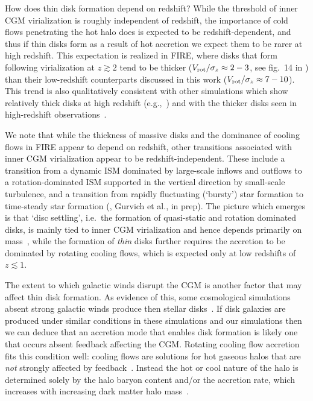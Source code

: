 \documentclass[fleqn,usenatbib]{mnras}
\begin{document}
How does thin disk formation depend on redshift?
While the threshold of inner CGM virialization is roughly independent of redshift, the importance of cold flows penetrating the hot halo does is expected to be redshift-dependent, and thus if thin disks form as a result of hot accretion we expect them to be rarer at high redshift.
This expectation is realized in FIRE, where disks that form following virialization at $z\gtrsim2$ tend to be thicker ($V_{\rm rot}/\sigma_z\approx2-3$, see fig.~14 in \citealt{Stern2021}) than their low-redshift counterparts discussed in this work ($V_{\rm rot}/\sigma_z\approx7-10$).
This trend is also qualitatively consistent with other simulations which show relatively thick disks at high redshift (e.g.,~\citealt{Pillepich2019, Dekel2019}) and with the thicker disks seen in high-redshift observations~\citep[e.g.][]{Tadaki2017}.

We note that while the thickness of massive disks and the dominance of cooling flows in FIRE appear to depend on redshift, other transitions  associated with inner CGM virialization appear to be redshift-independent.
These include a transition from a dynamic ISM dominated by large-scale inflows and outflows to a rotation-dominated ISM supported in the vertical direction by small-scale turbulence, and a transition from rapidly fluctuating (`bursty') star formation to time-steady star formation (\citealt{Stern2021, Yu2021}, Gurvich et al., in prep).  
The picture which emerges is that `disc settling', i.e.~the formation of quasi-static and rotation dominated disks, is mainly tied to inner CGM virialization and hence depends primarily on mass~\citep{Stern2021}, while the formation of \textit{thin} disks further requires the accretion to be dominated by rotating cooling flows, which is expected only at low redshifts of $z\lesssim1$. 

The extent to which galactic winds disrupt the CGM is another factor that may affect thin disk formation.
As evidence of this, some cosmological simulations absent strong galactic winds produce then stellar disks~\citep{Guedes2011, Bird2013}.
If disk galaxies are produced under similar conditions in these simulations and our simulations then we can deduce that an accretion mode that enables disk formation is likely one that occurs absent feedback affecting the CGM.
Rotating cooling flow accretion fits this condition well:
cooling flows are solutions for hot gaseous halos that are \textit{not} strongly affected by feedback~\citep{Stern2019}.
Instead the hot or cool nature of the halo is determined solely by the halo baryon content and/or the accretion rate, which increases with increasing dark matter halo mass~\citep{Stern2020}.
\end{document}
